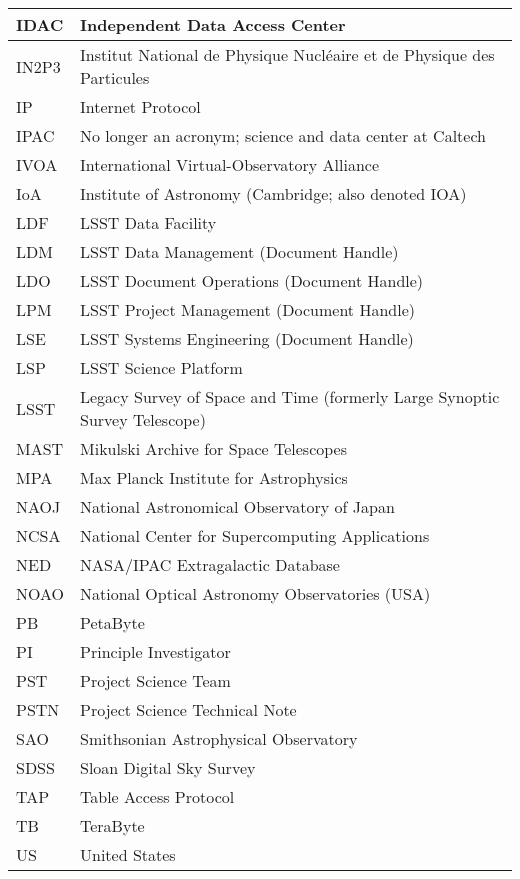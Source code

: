\begin{longtable}{p{}p{}}
IDAC & Independent Data Access Center \\\hline
IN2P3 & Institut National de Physique Nucléaire et de Physique des Particules \\\hline
IP & Internet Protocol \\\hline
IPAC & No longer an acronym; science and data center at Caltech \\\hline
IVOA & International Virtual-Observatory Alliance \\\hline
IoA & Institute of Astronomy (Cambridge; also denoted IOA) \\\hline
LDF & LSST Data Facility \\\hline
LDM & LSST Data Management (Document Handle) \\\hline
LDO & LSST Document Operations (Document Handle) \\\hline
LPM & LSST Project Management (Document Handle) \\\hline
LSE & LSST Systems Engineering (Document Handle) \\\hline
LSP & LSST Science Platform \\\hline
LSST & Legacy Survey of Space and Time (formerly Large Synoptic Survey Telescope) \\\hline
MAST & Mikulski Archive for Space Telescopes \\\hline
MPA & Max Planck Institute for Astrophysics \\\hline
NAOJ & National Astronomical Observatory of Japan \\\hline
NCSA & National Center for Supercomputing Applications \\\hline
NED & NASA/IPAC Extragalactic Database \\\hline
NOAO & National Optical Astronomy Observatories (USA) \\\hline
PB & PetaByte \\\hline
PI & Principle Investigator \\\hline
PST & Project Science Team \\\hline
PSTN & Project Science Technical Note \\\hline
SAO & Smithsonian Astrophysical Observatory \\\hline
SDSS & Sloan Digital Sky Survey \\\hline
TAP & Table Access Protocol \\\hline
TB & TeraByte \\\hline
US & United States \\\hline
\end{longtable}
